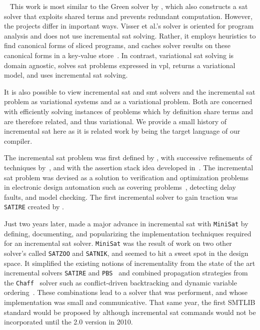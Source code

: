 ~\label{section:related-work:similar-solvers}
%
This work is most similar to the Green solver by \citet{VGD:FSE12}, which also
constructs a \ac{sat} solver that exploits shared terms and prevents redundant
computation. However, the projects differ in important ways. Visser et al.'s
solver is oriented for program analysis and does not use incremental \ac{sat}
solving. Rather, it employs heuristics to find canonical forms of sliced
programs, and caches solver results on these canonical forms in a key-value
store~\citep{redis}. In contrast, variational \ac{sat} solving is domain
agnostic, solves \ac{sat} problems expressed in \ac{vpl}, returns a variational
model, and uses incremental \ac{sat} solving.

It is also possible to view incremental \ac{sat} and \ac{smt} solvers and the
incremental \ac{sat} problem as variational systems and as a variational
problem. Both are concerned with efficiently solving instances of problems which
by definition share terms and are therefore related, and thus variational. We
provide a small history of incremental \ac{sat} here as it is related work by
being the target language of our compiler.

The incremental \ac{sat} problem was first defined by \citet{hooker_1993}, with
successive refinements of techniques by~\citet{branch-bound}, and with the
assertion stack idea developed in~\citet{kim2000solving}. The
incremental \ac{sat} problem was devised as a solution to verification and
optimization problems in electronic design automation such as covering
problems~\cite{10.1145/217474.217603}, detecting delay
faults\cite{10.1145/343647.343801}, and model
checking\cite{Clarke:1986:AVF:5397.5399}. The first incremental solver to gain
traction was \texttt{SATIRE} created by \citet{10.1145/378239.379019}.

Just two years later, \citet{10.1007/978-3-540-24605-3_37} made a major advance
in incremental \ac{sat} with \texttt{MiniSat} by defining, documenting, and
popularizing the implementation techniques required for an incremental \ac{sat}
solver. \texttt{MiniSat} was the result of work on two other solver's called
\texttt{SATZOO} and \texttt{SATNIK}, and seemed to hit a sweet spot in the
design space. It simplified the existing notions of incrementality from the
state of the art incremental solvers \texttt{SATIRE} and
\texttt{PBS}~\cite{10.1145/774572.774638} and combined propagation strategies
from the \texttt{Chaff}~\cite{Moskewicz:2001:CEE:378239.379017} solver such as
conflict-driven backtracking\cite{Zhang:2001:ECD:603095.603153} and dynamic
variable ordering~\cite{Moskewicz:2001:CEE:378239.379017}. These combinations
lead to a solver that was performent, and whose implementation was small and
communicative. That same year, the first SMTLIB standard would be proposed by
\citet{SMT-LIBformat} although incremental \ac{sat} commands would not be
incorporated until the 2.0 version\cite{BarST-RR-10} in 2010.

